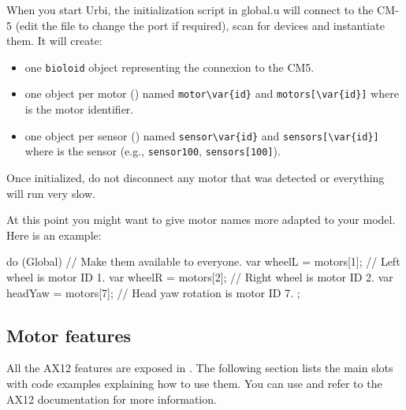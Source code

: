 When you start Urbi, the initialization script in global.u will connect to
the CM-5 (edit the file to change the port if required), scan for devices
and instantiate them. It will create:

\begin{itemize}
\item one \lstinline|bioloid| object representing the connexion to the CM5.
\item one object per motor () named
  \lstinline|motor\var{id}| and \lstinline|motors[\var{id}]| where 
  is the motor identifier.
\item one object per sensor () named
  \lstinline|sensor\var{id}| and \lstinline|sensors[\var{id}]| where
   is the sensor  (e.g., \lstinline|sensor100|,
  \lstinline|sensors[100]|).
\end{itemize}

Once initialized, do not disconnect any motor that was detected or
everything will run very slow.

At this point you might want to give motor names more adapted to your model.
Here is an example:

\begin{urbiunchecked}
do (Global) // Make them available to everyone.
{
  var wheelL = motors[1];  // Left wheel is motor ID 1.
  var wheelR = motors[2];  // Right wheel is motor ID 2.
  var headYaw = motors[7]; // Head yaw rotation is motor ID 7.
};
\end{urbiunchecked}


\subsection{Motor features}
\def\currentObject{AX12}

All the AX12 features are exposed in \us. The following section lists
the main slots with code examples explaining how to use them. You can use
 and refer to the AX12 documentation for
more information.

